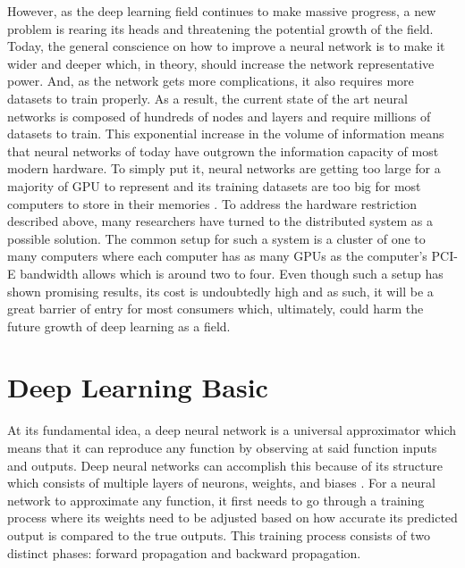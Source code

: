 \documentclass{IEEEtran}
\begin{document}
        However, as the deep learning field continues to make massive progress, a new problem is rearing its heads and threatening the potential growth of the field. Today, the general conscience on how to improve a neural network is to make it wider and deeper which, in theory, should increase the network representative power. And, as the network gets more complications, it also requires more datasets to train properly. As a result, the current state of the art neural networks is composed of hundreds of nodes and layers and require millions of datasets to train. This exponential increase in the volume of information means that neural networks of today have outgrown the information capacity of most modern hardware. To simply put it, neural networks are getting too large for a majority of GPU to represent and its training datasets are too big for most computers to store in their memories \cite{ben-nun_hoefler_2019}. To address the hardware restriction described above, many researchers have turned to the distributed system as a possible solution. The common setup for such a system is a cluster of one to many computers where each computer has as many GPUs as the computer's PCI-E bandwidth allows which is around two to four.  Even though such a setup has shown promising results, its cost is undoubtedly high and as such, it will be a great barrier of entry for most consumers which, ultimately, could harm the future growth of deep learning as a field.
        
    \section{Deep Learning Basic}
        At its fundamental idea, a deep neural network is a universal approximator which means that it can reproduce any function by observing at said function inputs and outputs. Deep neural networks can accomplish this because of its structure which consists of multiple layers of neurons, weights, and biases \cite{hornik_1991}. For a neural network to approximate any function, it first needs to go through a training process where its weights need to be adjusted based on how accurate its predicted output is compared to the true outputs. This training process consists of two distinct phases: forward propagation and backward propagation. 
\end{document}
